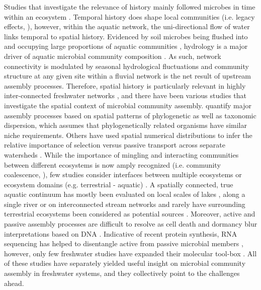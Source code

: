 \documentclass[12pt,a4paper]{article} %
\begin{document}
Studies that investigate the relevance of history mainly followed microbes in time within an ecosystem \citep{Shade2015b}. Temporal history does shape local communities (i.e. legacy effects, \citet{Fukami2015a}), however, within the aquatic network, the uni-directional flow of water links temporal to spatial history. Evidenced by soil microbes being flushed into and occupying large proportions of aquatic communities \citep{Ruiz-Gonzalez2015, Hauptmann2016, Crump2012, Besemer2013, Wisnoski2020}, hydrology is a major driver of aquatic microbial community composition \citep{Nino-Garcia2016}. As such, network connectivity is modulated by seasonal hydrological fluctuations \citep{deMelo2019} and community structure at any given site within a fluvial network is the net result of upstream assembly processes. Therefore, spatial history is particularly relevant in highly inter-connected freshwater networks \citep{Vass2017}, and there have been various studies that investigate the spatial context of microbial community assembly. \citet{Stegen2013a} quantify major assembly processes based on spatial patterns of phylogenetic as well as taxonomic dispersion, which assumes that phylogenetically related organisms have similar niche requirements. Others have used spatial numerical distributions to infer the relative importance of selection versus passive transport across separate watersheds \citep{Nino-Garcia2016b}. While the importance of mingling and interacting communities between different ecosystems is now amply recognized (i.e. community coalescence, \citet{Mansour2018}), few studies consider interfaces between multiple ecosystems or ecosystem domains (e.g. terrestrial - aquatic) \citep{Nemergut2011, Shade2013}. A spatially connected, true aquatic continuum has mostly been evaluated on local scales of lakes \citep{Logue2010, Adams2014, Langenheder2017}, along a single river \citep{Winter2007, Savio2015a, Hauptmann2016, Doherty2017, Gweon2020} or on interconnected stream networks \citep{Besemer2013, Widder2014, Read2015, Hassell2018, Wisnoski2020a} and rarely have surrounding terrestrial ecosystems been considered as potential sources \citep{Crump2012, Ruiz-Gonzalez2015, Wisnoski2020}. Moreover, active and passive assembly processes are difficult to resolve as cell death and dormancy blur interpretations based on DNA \citep{Cole1999, Jones2010}. Indicative of recent protein synthesis, RNA sequencing has helped to disentangle active from passive microbial members \citep{Bowsher2019}, however, only few freshwater studies have expanded their molecular tool-box \citep{Logue2010, Szekely2013, Aanderud2016, Peter2018, Wisnoski2020}. All of these studies have separately yielded useful insight on microbial community assembly in freshwater systems, and they collectively point to the challenges ahead.
\end{document}
